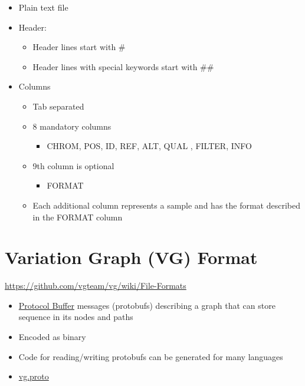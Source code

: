 \documentclass[
]{book}
\providecommand{\tightlist}{%
  \setlength{\itemsep}{0pt}\setlength{\parskip}{0pt}}
\begin{document}
\begin{itemize}
\tightlist
\item
  Plain text file
\item
  Header:

  \begin{itemize}
  \tightlist
  \item
    Header lines start with \#
  \item
    Header lines with special keywords start with \#\#
  \end{itemize}
\item
  Columns

  \begin{itemize}
  \tightlist
  \item
    Tab separated
  \item
    8 mandatory columns

    \begin{itemize}
    \tightlist
    \item
      CHROM, POS, ID, REF, ALT, QUAL , FILTER, INFO
    \end{itemize}
  \item
    9th column is optional

    \begin{itemize}
    \tightlist
    \item
      FORMAT
    \end{itemize}
  \item
    Each additional column represents a sample and has the format described in the FORMAT column
  \end{itemize}
\end{itemize}

\hypertarget{variation-graph-vg-format}{%
\section{Variation Graph (VG) Format}\label{variation-graph-vg-format}}

\url{https://github.com/vgteam/vg/wiki/File-Formats}

\begin{itemize}
\tightlist
\item
  \href{https://protobuf.dev}{Protocol Buffer} messages (protobufs) describing a graph that can store sequence in its nodes and paths
\item
  Encoded as binary
\item
  Code for reading/writing protobufs can be generated for
  many languages
\item
  \href{https://github.com/vgteam/libvgio/blob/master/deps/vg.proto}{vg.proto}
\end{itemize}
\end{document}
